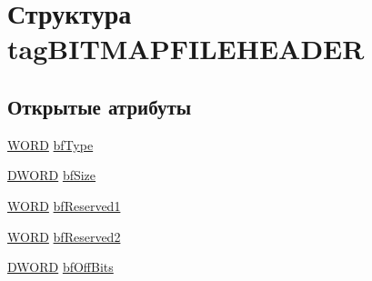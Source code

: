 \hypertarget{structtag_b_i_t_m_a_p_f_i_l_e_h_e_a_d_e_r}{\section{Структура tag\+B\+I\+T\+M\+A\+P\+F\+I\+L\+E\+H\+E\+A\+D\+E\+R}
\label{structtag_b_i_t_m_a_p_f_i_l_e_h_e_a_d_e_r}
}
\subsection*{Открытые атрибуты}
\begin{DoxyCompactItemize}
\item 
\hyperlink{2dgraph_8cpp_a197942eefa7db30960ae396d68339b97}{W\+O\+R\+D} \hyperlink{structtag_b_i_t_m_a_p_f_i_l_e_h_e_a_d_e_r_a64ced0b35fb93012ce3d66b2f1dd5bb8}{bf\+Type}
\item 
\hyperlink{2dgraph_8cpp_a28d75932431ade21e7752c9da7e8b55c}{D\+W\+O\+R\+D} \hyperlink{structtag_b_i_t_m_a_p_f_i_l_e_h_e_a_d_e_r_ad6fa0d3a907934d597b2773bc45e4d43}{bf\+Size}
\item 
\hyperlink{2dgraph_8cpp_a197942eefa7db30960ae396d68339b97}{W\+O\+R\+D} \hyperlink{structtag_b_i_t_m_a_p_f_i_l_e_h_e_a_d_e_r_aee794445cde1ce265644c1718afc6b52}{bf\+Reserved1}
\item 
\hyperlink{2dgraph_8cpp_a197942eefa7db30960ae396d68339b97}{W\+O\+R\+D} \hyperlink{structtag_b_i_t_m_a_p_f_i_l_e_h_e_a_d_e_r_a017d814d24a7c65de297be31856501dc}{bf\+Reserved2}
\item 
\hyperlink{2dgraph_8cpp_a28d75932431ade21e7752c9da7e8b55c}{D\+W\+O\+R\+D} \hyperlink{structtag_b_i_t_m_a_p_f_i_l_e_h_e_a_d_e_r_a5740a971a88afb51b014f54d9eb1c95c}{bf\+Off\+Bits}
\end{DoxyCompactItemize}



